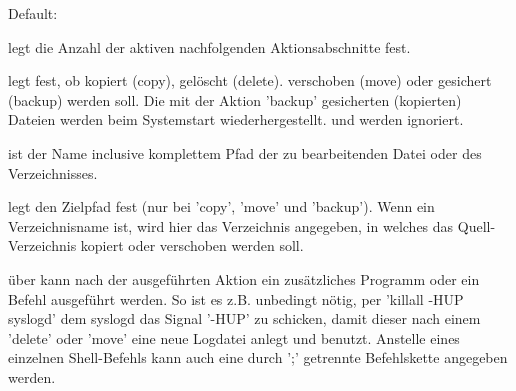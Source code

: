 \begin{description}

  Default: 

   legt die Anzahl der aktiven nachfolgenden Aktionsabschnitte fest.\\



   legt fest, ob kopiert (copy), gelöscht (delete). 
  verschoben (move) oder gesichert (backup) werden soll.
  Die mit der Aktion 'backup' gesicherten (kopierten) Dateien werden beim 
  Systemstart wiederhergestellt.  und
   werden ignoriert.\\
 

   ist der Name inclusive komplettem Pfad der
  zu bearbeitenden Datei oder des Verzeichnisses. \\
  

   legt den Zielpfad fest (nur bei 'copy', 'move'
  und 'backup'). Wenn  ein Verzeichnisname ist, wird 
  hier das Verzeichnis angegeben, in welches das Quell-Verzeichnis kopiert oder 
  verschoben werden soll.\\


  über  kann nach der ausgeführten Aktion ein 
  zusätzliches Programm oder ein Befehl ausgeführt
  werden. So ist es z.B. unbedingt nötig, per 'killall -HUP syslogd' dem syslogd
  das Signal '-HUP' zu schicken, damit dieser nach einem 'delete' oder 'move' 
  eine neue Logdatei anlegt und benutzt. Anstelle eines einzelnen Shell-Befehls 
  kann auch eine durch ';' getrennte Befehlskette angegeben werden.\\



\end{description}
